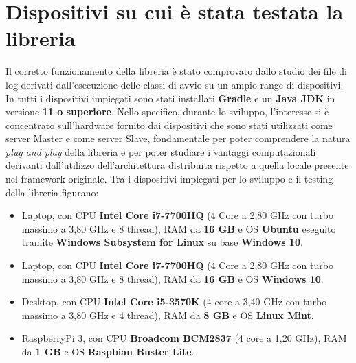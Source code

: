 \section{Dispositivi su cui è stata testata la libreria}
Il corretto funzionamento della libreria è stato comprovato dallo studio dei file di log derivati dall'esecuzione delle classi di avvio su un ampio range di dispositivi.
In tutti i dispositivi impiegati sono stati installati \textbf{Gradle} e un \textbf{Java JDK} in versione \textbf{11 o superiore}.
Nello specifico, durante lo sviluppo, l'interesse si è concentrato sull'hardware fornito dai dispositivi che sono stati utilizzati come server Master e come server Slave, fondamentale per poter comprendere la natura \textit{plug and play} della libreria e per poter studiare i vantaggi computazionali derivanti dall'utilizzo dell'architettura distribuita rispetto a quella locale presente nel framework originale.
Tra i dispositivi impiegati per lo sviluppo e il testing della libreria figurano:

\begin{itemize}
    \item Laptop, con CPU \textbf{Intel Core i7-7700HQ} (4 Core a 2,80 GHz con turbo massimo a 3,80 GHz e 8 thread), RAM da \textbf{16 GB} e OS \textbf{Ubuntu} eseguito tramite \textbf{Windows Subsystem for Linux} su base \textbf{Windows 10}.
    \item Laptop, con CPU \textbf{Intel Core i7-7700HQ} (4 Core a 2,80 GHz con turbo massimo a 3,80 GHz e 8 thread), RAM da \textbf{16 GB} e OS \textbf{Windows 10}.
    \item Desktop, con CPU \textbf{Intel Core i5-3570K} (4 core a 3,40 GHz con turbo massimo a 3,80 GHz e 4 thread), RAM da \textbf{8 GB} e OS \textbf{Linux Mint}.
    \item RaspberryPi 3, con CPU \textbf{Broadcom BCM2837} (4 core a 1,20 GHz), RAM da \textbf{1 GB} e OS \textbf{Raspbian Buster Lite}.
\end{itemize}
